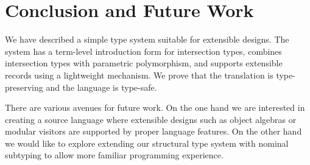\section{Conclusion and Future Work} \label{sec:conclusion}

We have described a simple type system suitable for extensible designs.
The system has a term-level introduction form for intersection types, combines intersection types with
parametric polymorphism, and supports extensible records using a lightweight
mechanism. We prove that the translation is type-preserving and the language is
type-safe.

There are various avenues for future work. On the one hand we are
interested in creating a source language where extensible designs such as object
algebras or modular visitors are supported by proper language features. On the
other hand we would like to explore extending our structural type system with
nominal subtyping to allow more familiar programming experience.
